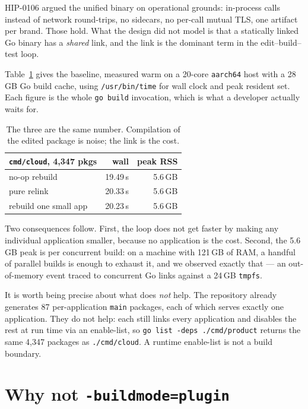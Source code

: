 \documentclass[11pt]{article}
\begin{document}
HIP-0106 argued the unified binary on operational grounds: in-process calls
instead of network round-trips, no sidecars, no per-call mutual TLS, one
artifact per brand. Those hold. What the design did not model is that a
statically linked Go binary has a \emph{shared} link, and the link is the
dominant term in the edit--build--test loop.

Table~\ref{tab:baseline} gives the baseline, measured warm on a 20-core
\texttt{aarch64} host with a 28\,GB Go build cache, using
\texttt{/usr/bin/time} for wall clock and peak resident set. Each figure is the
whole \texttt{go build} invocation, which is what a developer actually waits
for.

\begin{table}[h]
\centering
\begin{tabular}{lrr}
\toprule
\textbf{\texttt{cmd/cloud}, 4{,}347 pkgs} & \textbf{wall} & \textbf{peak RSS} \\
\midrule
no-op rebuild            & 19.49\,s & 5.6\,GB \\
pure relink              & 20.33\,s & 5.6\,GB \\
rebuild one small app    & 20.23\,s & 5.6\,GB \\
\bottomrule
\end{tabular}
\caption{The three are the same number. Compilation of the edited package is
noise; the link is the cost.}
\label{tab:baseline}
\end{table}

Two consequences follow. First, the loop does not get faster by making any
individual application smaller, because no application is the cost. Second, the
5.6\,GB peak is per concurrent build: on a machine with 121\,GB of RAM, a
handful of parallel builds is enough to exhaust it, and we observed exactly that
--- an out-of-memory event traced to concurrent Go links against a 24\,GB
\texttt{tmpfs}.

It is worth being precise about what does \emph{not} help. The repository
already generates 87 per-application \texttt{main} packages, each of which
serves exactly one application. They do not help: each still links every
application and disables the rest at run time via an enable-list, so
\texttt{go list -deps ./cmd/product} returns the same 4{,}347 packages as
\texttt{./cmd/cloud}. A runtime enable-list is not a build boundary.

\section{Why not \texttt{-buildmode=plugin}}
\end{document}
